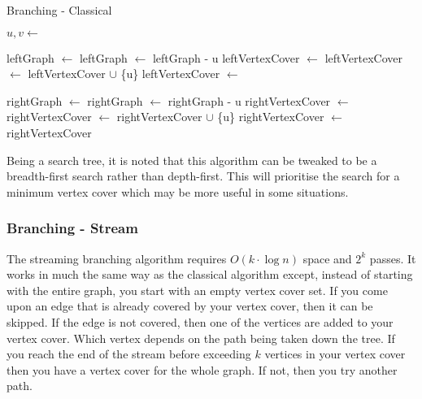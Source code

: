 \begin{algorithm}[htb]
    \caption{Branching - Classical}
    \label{alg:branching_classical}
    \DontPrintSemicolon

    \Func
    {
    }
    {
        $u, v \gets$ \;

        leftGraph $\gets$ \;
        leftGraph $\gets$ leftGraph - u\;
        leftVertexCover $\gets$ \;
        leftVertexCover $\gets$ leftVertexCover $\cup$ \{u\}\;
        leftVertexCover $\gets$ \;

        rightGraph $\gets$ \;
        rightGraph $\gets$ rightGraph - u\;
        rightVertexCover $\gets$ \;
        rightVertexCover $\gets$ rightVertexCover $\cup$ \{u\}\;
        rightVertexCover $\gets$ \;
        \Return rightVertexCover
    }
\end{algorithm}

Being a search tree, it is noted that this algorithm can be tweaked to be a
breadth-first search rather than depth-first. This will prioritise the search
for a minimum vertex cover which may be more useful in some situations.

\subsubsection{Branching - Stream}

The streaming branching algorithm requires \(O(k\cdot \log n)\) space and
\(2^k\) passes. It works in much the same way as the classical algorithm
except, instead of starting with the entire graph, you start with an empty
vertex cover set. If you come upon an edge that is already covered by your
vertex cover, then it can be skipped. If the edge is not covered, then one of
the vertices are added to your vertex cover. Which vertex depends on the path
being taken down the tree. If you reach the end of the stream before exceeding
\(k\) vertices in your vertex cover then you have a vertex cover for the whole
graph. If not, then you try another path.


